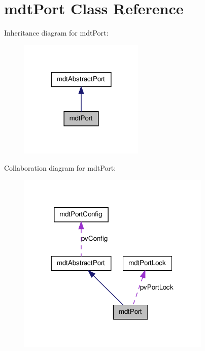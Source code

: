 \hypertarget{classmdt_port}{
\section{mdtPort Class Reference}
\label{classmdt_port}
}


Inheritance diagram for mdtPort:\nopagebreak
\begin{figure}[H]
\begin{center}
\leavevmode
\includegraphics[width=168pt]{classmdt_port__inherit__graph}
\end{center}
\end{figure}


Collaboration diagram for mdtPort:\nopagebreak
\begin{figure}[H]
\begin{center}
\leavevmode
\includegraphics[width=261pt]{classmdt_port__coll__graph}
\end{center}
\end{figure}
